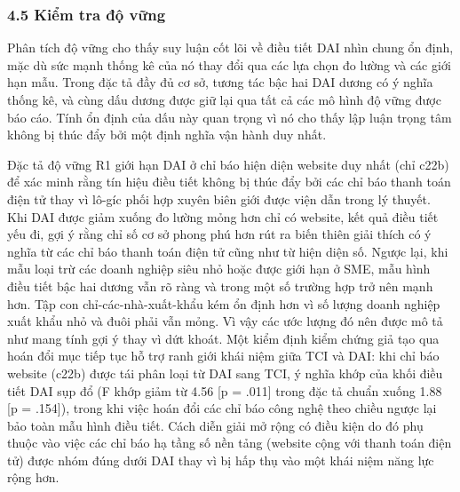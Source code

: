 \documentclass[12pt,a4paper]{article}
\begin{document}
\hypertarget{45-kiux1ec3m-tra-ux111ux1ed9-vux1eefng}{%
\subsubsection{4.5 Kiểm tra độ
vững}\label{45-kiux1ec3m-tra-ux111ux1ed9-vux1eefng}}

Phân tích độ vững cho thấy suy luận cốt lõi về điều tiết DAI nhìn chung
ổn định, mặc dù sức mạnh thống kê của nó thay đổi qua các lựa chọn đo
lường và các giới hạn mẫu. Trong đặc tả đầy đủ cơ sở, tương tác bậc hai
DAI dương có ý nghĩa thống kê, và cùng dấu dương được giữ lại qua tất cả
các mô hình độ vững được báo cáo. Tính ổn định của dấu này quan trọng vì
nó cho thấy lập luận trọng tâm không bị thúc đẩy bởi một định nghĩa vận
hành duy nhất.

Đặc tả độ vững R1 giới hạn DAI ở chỉ báo hiện diện website duy nhất (chỉ
c22b) để xác minh rằng tín hiệu điều tiết không bị thúc đẩy bởi các chỉ
báo thanh toán điện tử thay vì lô-gíc phối hợp xuyên biên giới được viện
dẫn trong lý thuyết. Khi DAI được giảm xuống đo lường mỏng hơn chỉ có
website, kết quả điều tiết yếu đi, gợi ý rằng chỉ số cơ sở phong phú hơn
rút ra biến thiên giải thích có ý nghĩa từ các chỉ báo thanh toán điện
tử cũng như từ hiện diện số. Ngược lại, khi mẫu loại trừ các doanh
nghiệp siêu nhỏ hoặc được giới hạn ở SME, mẫu hình điều tiết bậc hai
dương vẫn rõ ràng và trong một số trường hợp trở nên mạnh hơn. Tập con
chỉ-các-nhà-xuất-khẩu kém ổn định hơn vì số lượng doanh nghiệp xuất khẩu
nhỏ và đuôi phải vẫn mỏng. Vì vậy các ước lượng đó nên được mô tả như
mang tính gợi ý thay vì dứt khoát. Một kiểm định kiểm chứng giả tạo qua
hoán đổi mục tiếp tục hỗ trợ ranh giới khái niệm giữa TCI và DAI: khi
chỉ báo website (c22b) được tái phân loại từ DAI sang TCI, ý nghĩa khớp
của khối điều tiết DAI sụp đổ (F khớp giảm từ 4.56 {[}p = .011{]} trong
đặc tả chuẩn xuống 1.88 {[}p = .154{]}), trong khi việc hoán đổi các chỉ
báo công nghệ theo chiều ngược lại bảo toàn mẫu hình điều tiết. Cách
diễn giải mở rộng có điều kiện do đó phụ thuộc vào việc các chỉ báo hạ
tầng số nền tảng (website cộng với thanh toán điện tử) được nhóm đúng
dưới DAI thay vì bị hấp thụ vào một khái niệm năng lực rộng hơn.
\end{document}
